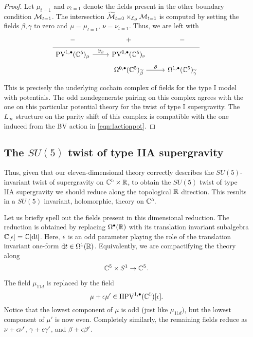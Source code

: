 \begin{proof}
Let $\mu_{t=1}$ and $\nu_{t=1}$ denote the fields present in the other boundary condition $\mathcal M_{t=1}$. 
The intersection $\widetilde {\mathcal M}_{t=0} \times_{\mathcal E_{\partial}} \mathcal M_{t=1}$ is computed by setting the fields $\beta, \gamma$ to zero and $\mu=\mu_{t=1}$, $\nu = \nu_{t=1}$. 
Thus, we are left with
\begin{equation}
  \label{eq:lin3} 
  \begin{tikzcd}[row sep = 1 ex]
    - & + & -\\ \hline
    \PV^{1,\bu}(\CC^5)_\mu \ar[r, "\div"] & \PV^{0,\bu}(\CC^5)_\nu  \\
         & \Omega^{0,\bu}(\CC^5)_{\til\beta} \ar[r, "\del"] & \Omega^{1,\bu}(\CC^5)_{\til\gamma} 
\end{tikzcd}
\end{equation}
This is precisely the underlying cochain complex of fields for the type I model with potentials. 
The odd nondegenerate pairing on this complex agrees with the one on this particular potential theory for the twist of type I supergravity. 
The $L_\infty$ structure on the parity shift of this complex is compatible with the one induced from the BV action in \eqref{eqn:Iactionpot}.
\end{proof}

\subsection{The $SU(5)$ twist of type IIA supergravity}
\label{s:su5IIA}


Thus, given that our eleven-dimensional theory correctly describes the $SU(5)$-invariant twist of supergravity on $\mathbb C^5 \times \mathbb R$, to obtain the $SU(5)$ twist of type IIA supergravity we should reduce along the topological $\mathbb R$ direction. 
This results in a $SU(5)$ invariant, holomorphic, theory on $\mathbb C^5$. 

Let us briefly spell out the fields present in this dimensional reduction. 
The reduction is obtained by replacing $\Omega^\bullet(\mathbb R)$ with its translation invariant subalgebra $\mathbb C[\epsilon] = \mathbb C[{\rm d} t]$. 
Here, $\epsilon$ is an odd parameter playing the role of the translation invariant one-form ${\rm d} t \in \Omega^1(\mathbb R)$. 
Equivalently, we are compactifying the theory along 
\[
\mathbb C^5 \times S^1 \to \mathbb C^5 .
\]

The field $\mu_{11d}$ is replaced by the field 
\[
\mu + \epsilon \mu' \in \Pi {\rm PV}^{1,\bullet}(\mathbb C^5) [\epsilon] .
\]
Notice that the lowest component of $\mu$ is odd (just like $\mu_{11d})$, but the lowest component of $\mu'$ is now even. 
Completely similarly, the remaining fields reduce as $\nu + \epsilon \nu'$, $\gamma + \epsilon \gamma'$, and $\beta + \epsilon \beta'$. 

